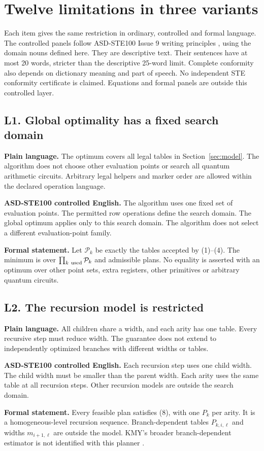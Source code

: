\documentclass[11pt,letterpaper]{article}
\newcommand{\Plain}[1]{\par\textbf{\color{navy}Plain language.} #1\par}
\newcommand{\STE}[1]{\par\textbf{\color{teal}ASD-STE100 controlled English.} #1\par}
\newcommand{\Formal}[1]{\par\textbf{Formal statement.} #1\par}
\begin{document}
\clearpage
\section{Twelve limitations in three variants}\label{sec:limits}
Each item gives the same restriction in ordinary, controlled and
formal language. The controlled panels follow ASD-STE100 Issue 9
writing principles \cite{ste}, using the domain nouns defined here.
They are descriptive text. Their sentences have at most 20 words,
stricter than the descriptive 25-word limit. Complete conformity
also depends on dictionary meaning and part of speech.
No independent STE conformity certificate is claimed.
Equations and formal panels are outside this controlled layer.

\subsection{L1. Global optimality has a fixed search domain}
\Plain{The optimum covers all legal tables in Section~\ref{sec:model}.
The algorithm does not choose other evaluation points or search all
quantum arithmetic circuits. Arbitrary legal helpers and marker order
are allowed within the declared operation language.}
\STE{The algorithm uses one fixed set of evaluation points. The permitted row operations define the search domain. The global optimum applies only to this search domain. The algorithm does not select a different evaluation-point family.}
\Formal{Let \(\mathcal P_k\) be exactly the tables accepted by
(1)--(4). The minimum is over
\(\prod_{k\ {\rm used}}\mathcal P_k\) and admissible plans.
No equality is asserted with an optimum over other point sets,
extra registers, other primitives or arbitrary quantum circuits.}

\subsection{L2. The recursion model is restricted}
\Plain{All children share a width, and each arity has one table.
Every recursive step must reduce width. The guarantee does not
extend to independently optimized branches with different widths
or tables.}
\STE{Each recursion step uses one child width. The child width must be smaller than the parent width. Each arity uses the same table at all recursion steps. Other recursion models are outside the search domain.}
\Formal{Every feasible plan satisfies (8), with one \(P_k\) per arity.
It is a homogeneous-level recursion sequence. Branch-dependent
tables \(P_{k,i,\ell}\) and widths \(m_{i+1,\ell}\) are outside the
model. KMY's broader branch-dependent estimator is not identified
with this planner \cite[App.~F.1]{kmy}.}
\end{document}
